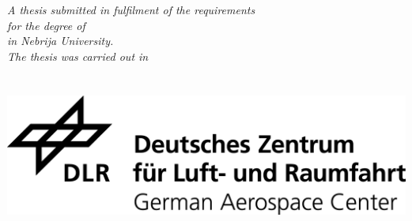\documentclass[
11pt, %
english, %
singlespacing, %
headsepline, %
]{MastersDoctoralThesis} %
\begin{document}
\begin{titlepage}
\begin{center}
\vfill

\large \textit{A thesis submitted in fulfilment of the requirements \\ for the degree of \degreename \\ in Nebrija University.}\\[0.3cm] %
\textit{The thesis was carried out in}\\[0.4cm]
\groupname\\\deptname\\[1cm] %
\vfill
\includegraphics[scale=0.65]{logos/DLR_Logo_EN_schwarz.png} %

\vfill
\end{center}
\end{titlepage}

\end{document}
